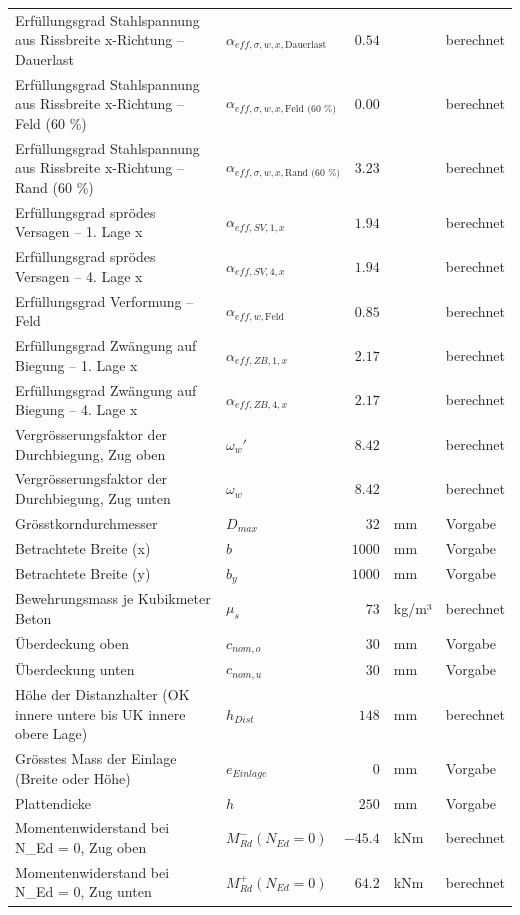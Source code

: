 \documentclass[11pt,a4paper]{article}
\begin{document}
\begin{xltabular}{\linewidth}{>{\raggedright\arraybackslash}Xlrll}
Erfüllungsgrad Stahlspannung aus Rissbreite x-Richtung – Dauerlast & $\alpha_{eff,\sigma,w,x,\text{Dauerlast}}$ & $0.54$ &  & berechnet \\
Erfüllungsgrad Stahlspannung aus Rissbreite x-Richtung – Feld (60 \%) & $\alpha_{eff,\sigma,w,x,\text{Feld (60 \%)}}$ & $0.00$ &  & berechnet \\
Erfüllungsgrad Stahlspannung aus Rissbreite x-Richtung – Rand (60 \%) & $\alpha_{eff,\sigma,w,x,\text{Rand (60 \%)}}$ & $3.23$ &  & berechnet \\
Erfüllungsgrad sprödes Versagen – 1. Lage x & $\alpha_{eff,SV,1,x}$ & $1.94$ &  & berechnet \\
Erfüllungsgrad sprödes Versagen – 4. Lage x & $\alpha_{eff,SV,4,x}$ & $1.94$ &  & berechnet \\
Erfüllungsgrad Verformung – Feld & $\alpha_{eff,w,\text{Feld}}$ & $0.85$ &  & berechnet \\
Erfüllungsgrad Zwängung auf Biegung – 1. Lage x & $\alpha_{eff,ZB,1,x}$ & $2.17$ &  & berechnet \\
Erfüllungsgrad Zwängung auf Biegung – 4. Lage x & $\alpha_{eff,ZB,4,x}$ & $2.17$ &  & berechnet \\
Vergrösserungsfaktor der Durchbiegung, Zug oben & $\omega_w'$ & $8.42$ &  & berechnet \\
Vergrösserungsfaktor der Durchbiegung, Zug unten & $\omega_w$ & $8.42$ &  & berechnet \\
Grösstkorndurchmesser & $D_{max}$ & $32$ & mm & Vorgabe \\
Betrachtete Breite (x) & $b$ & $1000$ & mm & Vorgabe \\
Betrachtete Breite (y) & $b_y$ & $1000$ & mm & Vorgabe \\
Bewehrungsmass je Kubikmeter Beton & $\mu_s$ & $73$ & kg/m³ & berechnet \\
Überdeckung oben & $c_{nom,o}$ & $30$ & mm & Vorgabe \\
Überdeckung unten & $c_{nom,u}$ & $30$ & mm & Vorgabe \\
Höhe der Distanzhalter (OK innere untere bis UK innere obere Lage) & $h_{Dist}$ & $148$ & mm & berechnet \\
Grösstes Mass der Einlage (Breite oder Höhe) & $e_{Einlage}$ & $0$ & mm & Vorgabe \\
Plattendicke & $h$ & $250$ & mm & Vorgabe \\
Momentenwiderstand bei N\_Ed = 0, Zug oben & $M_{Rd}^{-}(N_{Ed} = 0)$ & $-45.4$ & kNm & berechnet \\
Momentenwiderstand bei N\_Ed = 0, Zug unten & $M_{Rd}^{+}(N_{Ed} = 0)$ & $64.2$ & kNm & berechnet \\

\end{xltabular}
\end{document}
